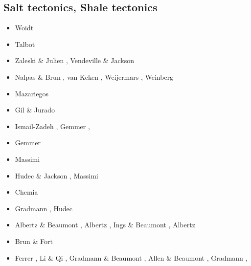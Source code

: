 \subsection{Salt tectonics, Shale tectonics}

\begin{scriptsize}
\begin{itemize}
\item[\nineteenseventyeight] Woidt \cite{woid78}
\item[\nineteenninetyone] Talbot \etal \cite{tars91}
\item[\nineteenninetytwo] Zaleski \& Julien \cite{zaju92},  Vendeville \& Jackson \cite{veja92}
\item[\nineteenninetythree] Nalpas \& Brun \cite{nabr93}, van Keken \etal \cite{vasv93}, 
                            Weijermars \etal \cite{wejv93}, Weinberg \cite{wein93}
\item[\nineteenninetysix] Mazariegos \etal \cite{maar96}
\item[\nineteenninetyeight] Gil \& Jurado \cite{giju98}
\item[\twothousandfour] Ismail-Zadeh \etal \cite{istt04}, Gemmer \etal \cite{geim04}, \cite{mcmg04}
\item[\twothousandfive] Gemmer \etal \cite{gebi05}
\item[\twothousandsix] Massimi \etal \cite{maqs06}
\item[\twothousandseven] Hudec \& Jackson \cite{huja07}, Massimi \etal \cite{maqs07}
\item[\twothousandeight] Chemia \etal \cite{chks08} 
\item[\twothousandnine] Gradmann  \etal \cite{grba09}, Hudec \etal \cite{hujs09}  
\item[\twothousandten] Albertz \& Beaumont \cite{albe10}, Albertz \etal \cite{albi10}, 
                       Ings \& Beaumont \cite{inbe10,inbe10b}, Albertz \etal \cite{albs10}
\item[\twothousandeleven] Brun \& Fort \cite{brfo11}
\item[\twothousandtwelve] Ferrer \etal \cite{fejr12}, Li \& Qi \cite{liqi12}, 
                          Gradmann \& Beaumont \cite{grbe12},
                          Allen \& Beaumont \cite{albe12}, Gradmann \etal \cite{grbi12},

\end{itemize}
\end{scriptsize}
